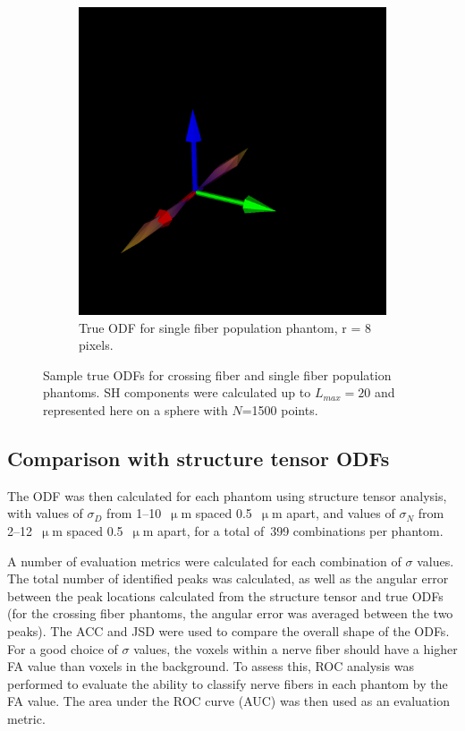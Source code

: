 \documentclass[11pt]{article}
\begin{document}
\begin{figure}[h]
\begin{subfigure}[t]{0.35\textwidth}
    \includegraphics[width=0.9\linewidth]{figs/r8_ODF}
    \caption{True ODF for single fiber population phantom, r = 8 pixels.}
    \label{fig:r8odf}
  \end{subfigure}
  \captionsetup{width=0.7\textwidth}
  \caption{Sample true ODFs for crossing fiber and single fiber population
    phantoms.  SH components were calculated up to $L_{max}=20$ and represented
    here on a sphere with $N$=1500 points.}
  \label{fig:true_odfs}
\end{figure}

\subsection{Comparison with structure tensor ODFs}
The ODF was then calculated for each phantom using structure tensor analysis,
with values of $\sigma_D$ from 1--10~$\upmu$m spaced 0.5~$\upmu$m apart,
and values of $\sigma_N$ from 2--12~$\upmu$m spaced 0.5~$\upmu$m apart, for a total
of~399 combinations per phantom.

A number of evaluation metrics were calculated for each combination of $\sigma$
values.  The total number of identified peaks was calculated, as well as the
angular error between the peak locations calculated from the structure tensor
and true ODFs (for the crossing fiber phantoms, the angular error was averaged
between the two peaks).  The ACC and JSD were used to compare the overall shape
of the ODFs. For a good choice of $\sigma$ values, the voxels within a nerve
fiber should have a higher FA value than voxels in the background. To assess
this, ROC analysis was performed to evaluate the ability to classify nerve
fibers in each phantom by the FA value. The area under the ROC curve (AUC) was
then used as an evaluation metric.
\end{document}
